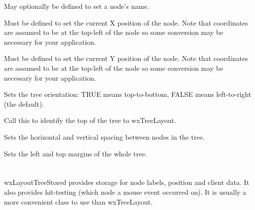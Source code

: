 

May optionally be defined to set a node's name.



Must be defined to set the current X position of the node. Note that
coordinates are assumed to be at the top-left of the node so some conversion
may be necessary for your application.



Must be defined to set the current Y position of the node. Note that
coordinates are assumed to be at the top-left of the node so some conversion
may be necessary for your application.



Sets the tree orientation: TRUE means top-to-bottom, FALSE means left-to-right (the default).

\label{wxtreelayoutsettopnode}


Call this to identify the top of the tree to wxTreeLayout.



Sets the horizontal and vertical spacing between nodes in the tree.

\label{wxtreelayoutsetmargins}


Sets the left and top margins of the whole tree.

\section{}\label{wxlayouttreestored}

wxLayoutTreeStored provides storage for node labels, position and client data. It also provides hit-testing
(which node a mouse event occurred on). It is usually a more convenient class to use than wxTreeLayout.


